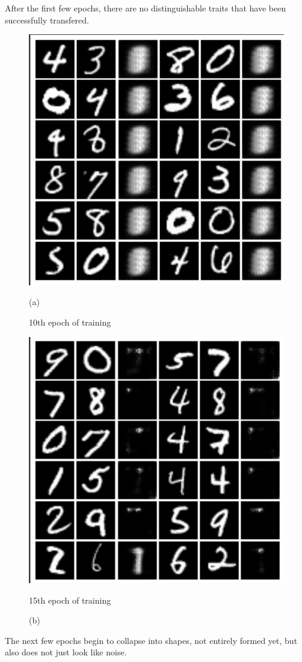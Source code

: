 \documentclass{article}
\begin{document}
After the first few epochs, there are no distinguishable traits that have been successfully transfered.
\clearpage
\begin{figure}[hbt]
    \centering
    \begin{minipage}{.5\textwidth}
        \centering
        \includegraphics[width=.4\linewidth]{images/EXP5_9.jpg}
        \caption{(a)}{10th epoch of training}
        \label{fig:sub3}
    \end{minipage}%
    \begin{minipage}{.5\textwidth}
        \centering
        \includegraphics[width=.4\linewidth]{images/EXP5_14.jpg}
        \caption{(b)}{15th epoch of training}
        \label{fig:sub4}
    \end{minipage}
\end{figure}

The next few epochs begin to collapse into shapes, not entirely formed yet, but also does not just look like noise.
\end{document}
